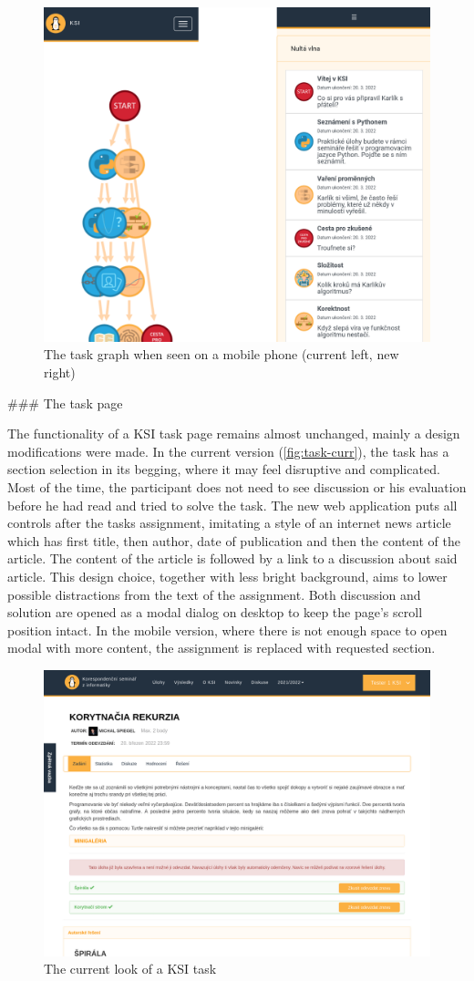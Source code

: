 \documentclass[
  digital, %
  oneside, %
  lof,     %
  nolot,     %
]{fithesis4}
\begin{document}
{\begin{figure}
\includegraphics[width=.5\textwidth]{assets/img/graph-mobile}
\caption{The task graph when seen on a mobile phone (current left, new right)}
\label{fig:graph-mobile}
\end{figure}


### The task page

The functionality of a KSI task page remains almost unchanged, mainly a design modifications were made. In the current version (\autoref{fig:task-curr}), the task has a section selection in its begging, where it may feel disruptive and complicated. Most of the time, the participant does not need to see discussion or his evaluation before he had read and tried to solve the task. The new web application puts all controls after the tasks assignment, imitating a style of an internet news article which has first title, then author, date of publication and then the content of the article. The content of the article is followed by a link to a discussion about said article. This design choice, together with less bright background, aims to lower possible distractions from the text of the assignment. Both discussion and solution are opened as a modal dialog on desktop to keep the page's scroll position intact. In the mobile version, where there is not enough space to open modal with more content, the assignment is replaced with requested section.


\begin{figure}
\includegraphics[width=.9\textwidth]{assets/img/task-curr}
\caption{The current look of a KSI task}
\label{fig:task-curr}
\end{figure}

}
\end{document}
